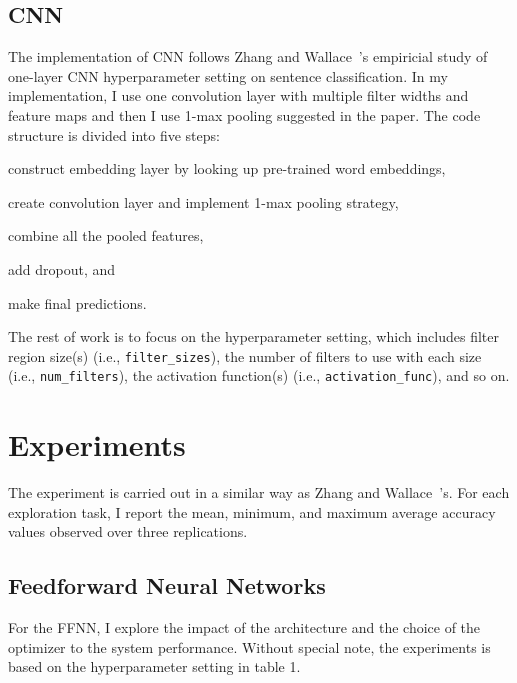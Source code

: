 \documentclass[11pt,a4paper]{article}
\begin{document}
\subsection{CNN}

The implementation of CNN follows Zhang and Wallace~'s empiricial study of
one-layer CNN hyperparameter setting on sentence classification. In my implementation, I use
one convolution layer with multiple filter widths and feature maps and then I use 1-max pooling
suggested in the paper. The code structure is divided into five steps: 
\begin {enumerate*}[1) ]
\item construct embedding layer by looking up pre-trained word embeddings,
\item create convolution layer and implement 1-max pooling strategy, 
\item combine all the pooled features,
\item add dropout, and 
\item make final predictions.
\end {enumerate*} 
The rest of work is to focus on the hyperparameter setting, which
includes filter region size(s) (i.e., \verb|filter_sizes|), 
the number of filters to use with each size (i.e., \verb|num_filters|),
the activation function(s) (i.e., \verb|activation_func|), and so on.

\section{Experiments}

The experiment is carried out in a similar way as Zhang and Wallace~'s.
For each exploration task, I report the mean, minimum, and maximum average 
accuracy values observed over three replications. 

\subsection{Feedforward Neural Networks}

For the FFNN, I explore the impact of the architecture and 
the choice of the optimizer to the system performance. Without special note, the experiments
is based on the hyperparameter setting in table 1.
\end{document}
